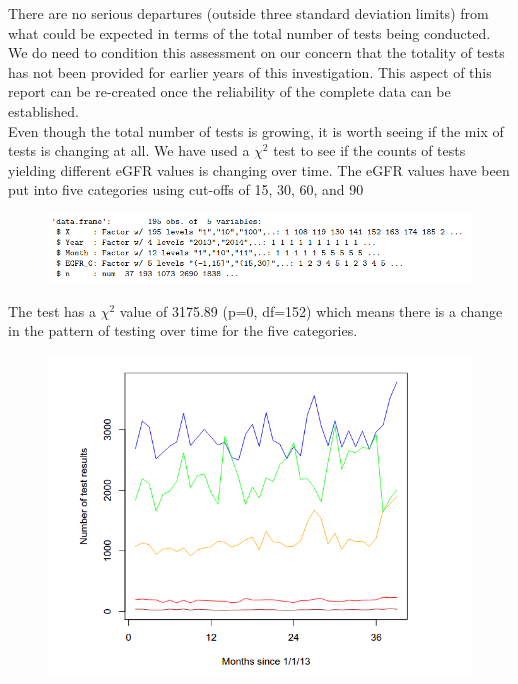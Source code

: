 \documentclass[11pt]{article}
\begin{document}
There are no serious  departures (outside three standard deviation limits) from what could be expected in terms of the total number of tests being conducted. We do need to condition this assessment on our concern that the totality of tests has not been provided for earlier years of this investigation. This aspect of this report can be re-created once the reliability of the complete data can be established.\\

Even though the total number of tests is growing, it is worth seeing if the mix of tests is changing at all. We have used a $\chi^2$ test to see if the counts of tests yielding different eGFR values is changing over time. The eGFR values have been put into five categories using cut-offs of 15, 30, 60, and 90\\

\begin{figure}[htp]
\centering
\includegraphics[scale=0.50]{fig5.png}
\caption{}
\label{}
\end{figure}

The test has a $\chi^2$ value of 3175.89 (p=0, df=152) which means there is a change in the pattern of testing over time for the five categories.\\

\begin{figure}[htp]
\centering
\includegraphics[scale=0.50]{fig6.png}
\caption{}
\label{}
\end{figure}
\end{document}
